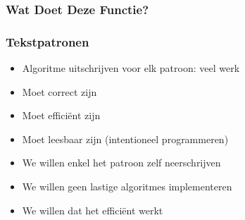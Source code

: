 \begin{frame}
  \frametitle{Wat Doet Deze Functie?}
  \vskip2mm
\end{frame}

\begin{frame}
  \frametitle{Tekstpatronen}
  \begin{itemize}
    \item Algoritme uitschrijven voor elk patroon: veel werk
    \item Moet correct zijn
    \item Moet effici\"ent zijn
    \item Moet leesbaar zijn (intentioneel programmeren)
  \end{itemize}
  \vskip5mm
  \begin{itemize}
    \item We willen enkel het patroon zelf neerschrijven
    \item We willen geen lastige algoritmes implementeren
    \item We willen dat het effici\"ent werkt
  \end{itemize}
\end{frame}

